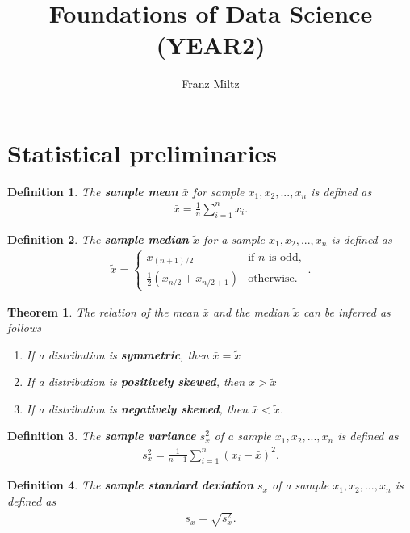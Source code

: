 \documentclass{article}
\theoremstyle{sltheorem}
\newtheorem{definition}{Definition}[section]
\newtheorem{theorem}{Theorem}[section]
\newcommand*\B[1]{\textbf{#1}}
\begin{document}
\title{Foundations of Data Science (YEAR2)}
\author{Franz Miltz}
\maketitle
\tableofcontents
\pagebreak
\section{Statistical preliminaries}
\begin{definition}
	The \B{sample mean} $\bar{x}$ for sample $x_1, x_2, ..., x_n$
	is defined as
	\begin{align*}
		\bar{x} = \frac{1}{n}\sum_{i=1}^n x_i.
	\end{align*}
\end{definition}
\begin{definition}
	The \B{sample median} $\tilde x$ for a sample $x_1, x_2, ..., x_n$ is defined as 
	\begin{align*}
		\tilde x = \begin{cases}
			x_{(n+1)/2} 				   &\text{if $n$ is odd},\\
			\frac{1}{2}(x_{n/2}+x_{n/2+1}) &\text{otherwise}.
		\end{cases}.
	\end{align*}
\end{definition}
\begin{theorem}
	The relation of the mean $\bar x$ and the median $\tilde x$ can be inferred as follows
	\begin{enumerate}
		\item If a distribution is \B{symmetric}, then $\bar x = \tilde x$
		\item If a distribution is \B{positively skewed}, then $\bar x > \tilde x$
		\item If a distribution is \B{negatively skewed}, then $\bar x < \tilde x$.
	\end{enumerate}
\end{theorem}
\begin{definition}
	The \B{sample variance} $s_x^2$ of a sample $x_1, x_2, ..., x_n$ is defined as
	\begin{align*}
		s_x^2 = \frac{1}{n-1}\sum_{i=1}^n (x_i-\bar x)^2.
	\end{align*}
\end{definition}
\begin{definition}
	The \B{sample standard deviation} $s_x$ of a sample $x_1, x_2, ..., x_n$ is defined as
	\begin{align*}
		s_x = \sqrt{s_x^2}.
	\end{align*}
\end{definition}
\end{document}
